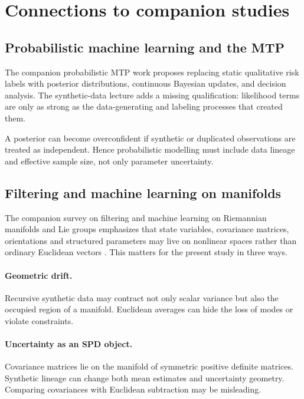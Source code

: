 \section{Connections to companion studies}

\subsection{Probabilistic machine learning and the MTP}

The companion probabilistic MTP work proposes replacing static qualitative risk labels with posterior distributions, continuous Bayesian updates, and decision analysis. The synthetic-data lecture adds a missing qualification: likelihood terms are only as strong as the data-generating and labeling processes that created them.

A posterior can become overconfident if synthetic or duplicated observations are treated as independent. Hence probabilistic modelling must include data lineage and effective sample size, not only parameter uncertainty.

\subsection{Filtering and machine learning on manifolds}

The companion survey on filtering and machine learning on Riemannian manifolds and Lie groups emphasizes that state variables, covariance matrices, orientations and structured parameters may live on nonlinear spaces rather than ordinary Euclidean vectors \citep{labsir2026filtering}. This matters for the present study in three ways.

\paragraph{Geometric drift.} Recursive synthetic data may contract not only scalar variance but also the occupied region of a manifold. Euclidean averages can hide the loss of modes or violate constraints.

\paragraph{Uncertainty as an SPD object.} Covariance matrices lie on the manifold of symmetric positive definite matrices. Synthetic lineage can change both mean estimates and uncertainty geometry. Comparing covariances with Euclidean subtraction may be misleading.

